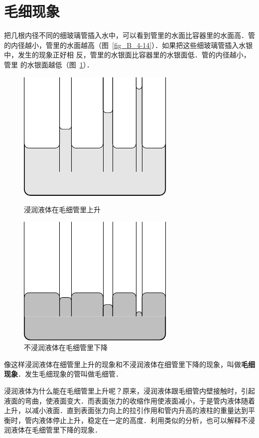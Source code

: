 \section{毛细现象}
把几根内径不同的细玻璃管插入水中，可以看到管里的水面比容器里的水面高．管的内径越小，管里的水面越高（图~\ref{fig_B_4-14}）．如果把这些细玻璃管插入水银中，发生的现象正好相
反，管里的水银面比容器里的水银面低．管的内径越小，管里
的水银面越低（图~\ref{fig_B_4-15}）．
\begin{figure}[htbp]
    \centering
    \begin{minipage}[t]{0.48\textwidth}
        \centering
        \includegraphics{fig/B/4-14.pdf}
        \caption{浸润液体在毛细管里上升}\label{fig_B_4-14}
    \end{minipage}
    \hfil
    \begin{minipage}[t]{0.48\textwidth}
        \centering
        \includegraphics{fig/B/4-15.pdf}
        \caption{不浸润液体在毛细管里下降}\label{fig_B_4-15}
    \end{minipage}
\end{figure}

像这样浸润液体在细管里上升的现象和不浸润液体在细管里下降的现象，叫做\textbf{毛细现象}．发生毛细现象的管叫做毛细管．

浸润液体为什么能在毛细管里上升呢？原来，浸润液体跟毛细管内壁接触时，引起液面的弯曲，使液面变大．而表面张力的收缩作用使液面减小，于是管内液体随着上升，以减小液面．直到表面张力向上的拉引作用和管内升高的液柱的重量达到平衡时，管内液体停止上升，稳定在一定的高度．利用类似的分析，也可以解释不浸润液体在毛细管里下降的现象．

